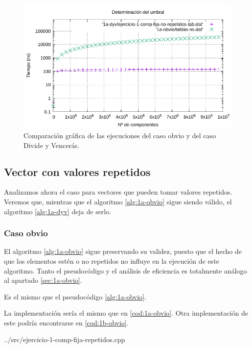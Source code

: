 \begin{figure}
	\centering
	\includegraphics[scale=0.87]{img/e1a-comp.pdf}
	\caption{Comparación gráfica de las ejecuciones del caso obvio y del caso Divide y Vencerás.}
	\label{fig:1a-comp-datos}
\end{figure}

\subsection{Vector con valores repetidos}

Analizamos ahora el caso para vectores que pueden tomar valores repetidos. Veremos que, mientras que el algoritmo
\ref{alg:1a-obvio} sigue siendo válido, el algoritmo \ref{alg:1a-dyv} deja de serlo. 

\subsubsection{Caso obvio}

El algoritmo \ref{alg:1a-obvio} sigue preservando su validez, puesto que el hecho de que los elementos estén o no
repetidos no influye en la ejecución de este algoritmo. Tanto el pseudocódigo y el análisis de eficiencia es totalmente
análogo al apartado \ref{sec:1a-obvio}. 


Es el mismo que el pseudocódigo \ref{alg:1a-obvio}. 


La implementación sería el mismo que en \ref{cod:1a-obvio}. Otra implementación de este podría encontrarse en \ref{cod:1b-obvio}. 


{../src/ejercicio-1-comp-fija-repetidos.cpp} 


